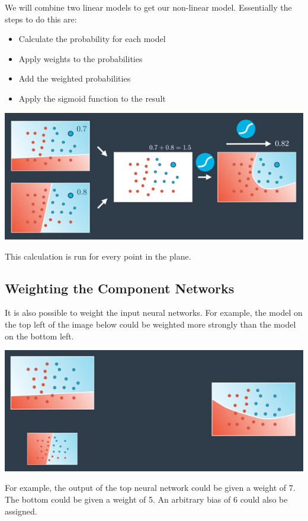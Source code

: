 We will combine two linear models to get our non-linear model. Essentially the steps to do this are:

\begin{itemize}
    \item Calculate the probability for each model
    \item Apply weights to the probabilities
    \item Add the weighted probabilities
    \item Apply the sigmoid function to the result
\end{itemize}

\includegraphics[width=1\linewidth]{img//intro//introNN/neural-network-architecture-3.png}

This calculation is run for every point in the plane.

\subsection{Weighting the Component Networks}
It is also possible to weight the input neural networks. For example, the model on the top left of the image below could be weighted more strongly than the model on the bottom left.

\includegraphics[width=1\linewidth]{img//intro//introNN/neural-network-architecture-4.png}

For example, the output of the top neural network could be given a weight of 7. The bottom could be given a weight of 5. An arbitrary bias of 6 could also be assigned.

